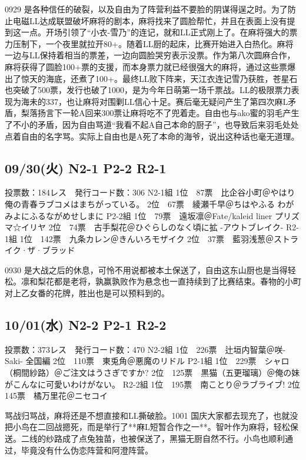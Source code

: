 0929 是各种信任的破裂，以及自由为了阵营利益不要脸的阴谋得逞之时。为了防止电磁LL达成联盟破坏麻将的剧本，麻将找来了圆脸帮忙，并且在表面上没有提到这一点。开场引领了“小衣-雪乃”的连记，就和LL正式刚上了。在麻将强大的票力压制下，一个夜里就拉开80+。随着LL厨的起床，比赛开始进入白热化。麻将一边与LL保持着相当的票差，一边向圆脸哭穷表示没票。作为第八次圆麻合作，麻将获得了圆脸100+票的支援，而本身票力就已经很强大的麻将，通过这些票爆出了惊天的海底，还煮了100+。最终LL败下阵来，天江衣连记雪乃获胜，苍星石也突破了500票，发行也破了1000，是为今年日萌第一场千票战。LL的极限票力表现为海未的337，也让麻将对围剿LL信心十足。赛后毫无疑问产生了第四次麻L矛盾，梨落扬言下一轮A回来300票让麻将吃不了兜着走。自由也与ako蜜的羽毛产生了不小的矛盾，因为自由骂道“我看不起A自己本命的厨子”，也导致后来羽毛处处点着自由的名字骂。实际上自由也是A死了本命的海爷，说出这种话也毫无道理。

\subsection{09/30(火) N2-1 P2-2 R2-1}

    投票数：184レス　発行コード数：306
    N2-1組
    1位　87票　比企谷小町＠やはり俺の青春ラブコメはまちがっている。
    2位　67票　綾瀬千早＠ちはやふる わがみよにふるながめせしまに
    P2-2組
    1位　79票　遠坂凛＠Fate/kaleid liner プリズマ☆イリヤ
    2位　74票　古手梨花＠ひぐらしのなく頃に拡 -アウトブレイク-
    R2-1組
    1位　142票　九条カレン＠きんいろモザイク
    2位　37票　藍羽浅葱＠ストライク·ザ·ブラッド

0930 是大战之后的休息，可怜不用说都被本土保送了，自由这东山厨也是当得轻松。凛和梨花都是老将，孰赢孰败作为悬念也一直持续到了比赛结束。春物的小町对上乙女番的花牌，胜出也是可以预料到的。

\subsection{10/01(水) N2-2 P2-1 R2-2}

    投票数：373レス　発行コード数：470
    N2-2組
    1位　226票　辻垣内智葉＠咲-Saki- 全国編
    2位　110票　東兎角＠悪魔のリドル
    P2-1組
    1位　229票　シャロ（桐間紗路）＠ご注文はうさぎですか?
    2位　125票　黒猫（五更瑠璃）＠俺の妹がこんなに可愛いわけがない。
    R2-2組
    1位　195票　南ことり＠ラブライブ!
    2位　145票　橘万里花＠ニセコイ

骂战归骂战，麻将还是不想直接和LL撕破脸。1001 国庆大家都去现充了，也就没把小鸟在二回战摁死，而是举行了**麻L短暂合作之一**。智叶作为麻将，轻松保送。二线的纱路成了点兔独苗，也被保送了，黑猫无厨自然不行。小鸟也顺利通过，毕竟没有什么伪恋阵营和阿澄阵营。

